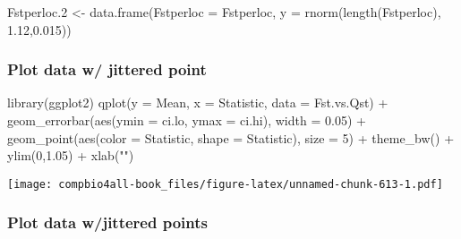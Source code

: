 \documentclass[
]{book}
\newenvironment{Shaded}{\begin{snugshade}}{\end{snugshade}}
\newcommand{\AttributeTok}[1]{\textcolor[rgb]{0.77,0.63,0.00}{#1}}
\newcommand{\DecValTok}[1]{\textcolor[rgb]{0.00,0.00,0.81}{#1}}
\newcommand{\FloatTok}[1]{\textcolor[rgb]{0.00,0.00,0.81}{#1}}
\newcommand{\FunctionTok}[1]{\textcolor[rgb]{0.00,0.00,0.00}{#1}}
\newcommand{\NormalTok}[1]{#1}
\newcommand{\OtherTok}[1]{\textcolor[rgb]{0.56,0.35,0.01}{#1}}
\newcommand{\SpecialCharTok}[1]{\textcolor[rgb]{0.00,0.00,0.00}{#1}}
\newcommand{\StringTok}[1]{\textcolor[rgb]{0.31,0.60,0.02}{#1}}
\begin{document}
\begin{Shaded}
\begin{Highlighting}[]
\NormalTok{Fstperloc}\FloatTok{.2} \OtherTok{\textless{}{-}} \FunctionTok{data.frame}\NormalTok{(}\AttributeTok{Fstperloc =}\NormalTok{ Fstperloc,}
                          \AttributeTok{y =} \FunctionTok{rnorm}\NormalTok{(}\FunctionTok{length}\NormalTok{(Fstperloc), }\FloatTok{1.12}\NormalTok{,}\FloatTok{0.015}\NormalTok{))}
\end{Highlighting}
\end{Shaded}

\hypertarget{plot-data-w-jittered-point}{%
\subsubsection{Plot data w/ jittered point}\label{plot-data-w-jittered-point}}

\begin{Shaded}
\begin{Highlighting}[]
\FunctionTok{library}\NormalTok{(ggplot2)}
\FunctionTok{qplot}\NormalTok{(}\AttributeTok{y =}\NormalTok{ Mean,}
      \AttributeTok{x =}\NormalTok{ Statistic,}
      \AttributeTok{data =}\NormalTok{ Fst.vs.Qst) }\SpecialCharTok{+}
  \FunctionTok{geom\_errorbar}\NormalTok{(}\FunctionTok{aes}\NormalTok{(}\AttributeTok{ymin =}\NormalTok{ ci.lo, }\AttributeTok{ymax =}\NormalTok{ ci.hi),}
                \AttributeTok{width =} \FloatTok{0.05}\NormalTok{) }\SpecialCharTok{+}
  \FunctionTok{geom\_point}\NormalTok{(}\FunctionTok{aes}\NormalTok{(}\AttributeTok{color =}\NormalTok{ Statistic, }
                 \AttributeTok{shape =}\NormalTok{ Statistic),}
             \AttributeTok{size =} \DecValTok{5}\NormalTok{) }\SpecialCharTok{+}
  \FunctionTok{theme\_bw}\NormalTok{() }\SpecialCharTok{+}
  \FunctionTok{ylim}\NormalTok{(}\DecValTok{0}\NormalTok{,}\FloatTok{1.05}\NormalTok{) }\SpecialCharTok{+}
  \FunctionTok{xlab}\NormalTok{(}\StringTok{""}\NormalTok{)}
\end{Highlighting}
\end{Shaded}

\texttt{[image: compbio4all-book\_files/figure-latex/unnamed-chunk-613-1.pdf]}

\hypertarget{plot-data-wjittered-points}{%
\subsubsection{Plot data w/jittered points}\label{plot-data-wjittered-points}}
\end{document}
